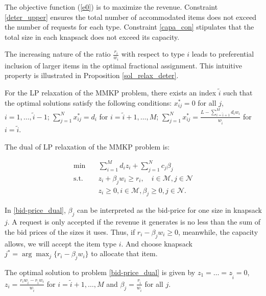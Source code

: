 The objective function (\ref{e0}) is to maximize the revenue. Constraint \eqref{deter_upper} ensures the total number of accommodated items does not exceed the number of requests for each type. Constraint \eqref{capa_con} stipulates that the total size in each knapsack does not exceed its capacity.


The increasing nature of the ratio $\frac{r_i}{w_i}$ with respect to type $i$ leads to preferential inclusion of larger items in the optimal fractional assignment. This intuitive property is illustrated in Proposition \ref{sol_relax_deter}. 


\begin{prop}\label{sol_relax_deter}
For the LP relaxation of the \textup{MMKP} problem, there exists an index $\tilde{i}$ such that the optimal solutions satisfy the following conditions: $x_{ij}^{*} = 0$ for all $j$, $i = 1,\ldots, \tilde{i}-1$; $\sum_{j=1}^{N} x_{ij}^{*} = d_{i}$ for $i = \tilde{i}+1,\ldots, M$; $\sum_{j=1}^{N} x_{ij}^{*} = \frac{L - \sum_{i = \tilde{i}+1}^{M} {d_i w_i}}{w_{\tilde{i}}}$ for $i = \tilde{i}$.
\end{prop}

The dual of LP relaxation of the MMKP problem is:

\begin{equation}\label{bid-price_dual}
    \begin{aligned}
    \min \quad & \sum_{i=1}^{M} d_i z_i + \sum_{j= 1}^{N} c_j \beta_{j} \\
    \text {s.t.} \quad & z_{i} + \beta_j w_i \geq r_i, \quad i \in \mathcal{M}, j \in \mathcal{N} \\
    & z_{i} \geq 0, i \in \mathcal{M}, \beta_{j} \geq 0, j \in \mathcal{N}.
    \end{aligned}
  \end{equation}

In \eqref{bid-price_dual}, $\beta_{j}$ can be interpreted as the bid-price for one size in knapsack $j$. A request is only accepted if the revenue it generates is no less than the sum of the bid prices of the sizes it uses. Thus, if $r_i -\beta_{j} w_i \geq 0$, meanwhile, the capacity allows, we will accept the item type $i$. And choose knapsack $j^{*} = \arg \max_{j} \{r_i -\beta_{j} w_i\}$ to allocate that item.

\begin{lem}\label{bid-price}
The optimal solution to problem \eqref{bid-price_dual} is given by $z_1 = \ldots = z_{\tilde{i}} =0$, $z_{i} = \frac{r_{i} w_{\tilde{i}} - r_{\tilde{i}} w_{i}}{w_{\tilde{i}}}$ for $i = \tilde{i}+1, \ldots, M$ and $\beta_j = \frac{r_{\tilde{i}}}{w_{\tilde{i}}}$ for all $j$.
\end{lem}

